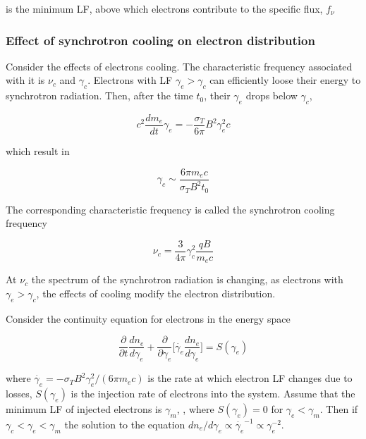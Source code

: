 is the minimum \ac{LF}, above which electrons contribute to the specific flux, $f_{\nu}$



\subsubsection{Effect of synchrotron cooling on electron distribution}

Consider the effects of electrons cooling. 
The characteristic frequency associated with it is $\nu_c$ and $\gamma_c$.
Electrons with \ac{LF} $\gamma_e > \gamma_c$ can efficiently loose their energy to synchrotron radiation. Then, after the time $t_0$, their $\gamma_e$ drops below $\gamma_c$, 

\begin{equation}
c^2 \frac{dm_e}{dt} \gamma_e = -\frac{\sigma_T}{6\pi} B^2 \gamma_e^2 c
\end{equation}

which result in 

\begin{equation}
\gamma_c \sim \frac{6 \pi m_e c}{\sigma_T B^2 t_0}
\end{equation}

The corresponding characteristic frequency is called the synchrotron cooling frequency

\begin{equation}
\nu_c = \frac{3}{4\pi} \gamma_c^2 \frac{q B}{m_e c}
\end{equation}

At $\nu_c$ the spectrum of the synchrotron radiation is changing, as electrons with $\gamma_e > \gamma_c$, the effects of cooling modify the electron distribution. 

Consider the continuity equation for electrons in the energy space 

\begin{equation}
\frac{\partial }{\partial t}\frac{d n_e}{d\gamma_e} + \frac{\partial}{\partial \gamma_e}\Big[ \dot{\gamma_e}\frac{dn_e}{d\gamma_e} \Big] = S(\gamma_e)
\end{equation}

where $\dot{\gamma_e} = -\sigma_T B^2 \gamma_e^2 / (6\pi m_e c)$ is the rate at which electron \ac{LF} changes due to losses, $S(\gamma_e)$ is the injection rate of electrons into the system.
Assume that the minimum \ac{LF} of injected electrons is $\gamma_m$, \eg, where $S(\gamma_e) = 0$ for $\gamma_e < \gamma_m$.
Then if $\gamma_c < \gamma_e < \gamma_m$ the solution to the equation $dn_{e}/d\gamma_e \propto \dot{\gamma_e}^{-1} \propto \gamma_e^{-2}$.

